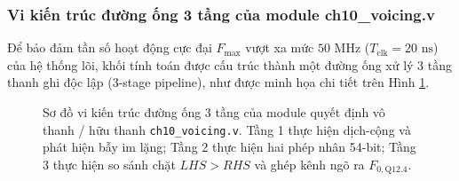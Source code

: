 \subsubsection*{Vi kiến trúc đường ống 3 tầng của module ch10\_voicing.v}
Để bảo đảm tần số hoạt động cực đại $F_{\max}$ vượt xa mức $50\text{ MHz}$ ($T_{\text{clk}} = 20\text{ ns}$) của hệ thống lõi, khối tính toán được cấu trúc thành một đường ống xử lý 3 tầng thanh ghi độc lập (3-stage pipeline), như được minh họa chi tiết trên Hình \ref{fig:ch10_pipeline}.

\begin{figure}[htbp]
    \centering
    
    \caption{Sơ đồ vi kiến trúc đường ống 3 tầng của module quyết định vô thanh / hữu thanh \texttt{ch10\_voicing.v}. Tầng 1 thực hiện dịch-cộng và phát hiện bẫy im lặng; Tầng 2 thực hiện hai phép nhân 54-bit; Tầng 3 thực hiện so sánh chặt $LHS > RHS$ và ghép kênh ngõ ra $F_{0,\text{Q12.4}}$.}
    \label{fig:ch10_pipeline}
\end{figure}

